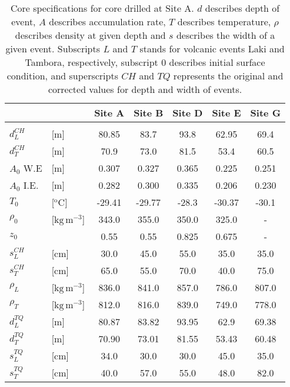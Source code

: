 \documentclass[../../CompleteThesis2/Complete_2ndDraft]{subfiles}
\begin{document}
	\begin{table}[h]
	\centering
	\begin{tabular}{l l|c c c c c}
		& & \textbf{Site A}& \textbf{Site B}& \textbf{Site D}& \textbf{Site E}& \textbf{Site G} \\[0.1cm]
		\hline 
		&&&&&& \\
		$d_{L}^{CH}$ & [m] & 80.85 & 83.7 & 93.8 & 62.95 & 69.4 \\[0.15cm]
		$d_{T}^{CH}$ & [m] & 70.9 & 73.0 & 81.5 & 53.4 & 60.5 \\[0.15cm]
		$A_0$ W.E & [m] & 0.307 & 0.327 & 0.365 & 0.225 & 0.251 \\[0.15cm]
		$A_0$ I.E. & [m] & 0.282 & 0.300 & 0.335 & 0.206 & 0.230 \\[0.15cm]
		$T_0$ & [$^{\text{o}}$C] & -29.41 & -29.77 & -28.3 & -30.37 & -30.1 \\[0.15cm]
		$\rho_0$ & [$\text{kg}\,\text{m}^{-3}$] & 343.0 & 355.0 & 350.0 & 325.0 & - \\[0.15cm]
		$z_0$ & & 0.55 & 0.55 & 0.825 & 0.675 & - \\[0.15cm]
		$s_L^{CH}$ & [cm] & 30.0 & 45.0 & 55.0 & 35.0 & 35.0 \\[0.15cm]
		$s_T^{CH}$ & [cm] & 65.0 & 55.0 & 70.0 & 40.0 & 75.0 \\[0.15cm]
		$\rho_L$ & [$\text{kg}\,\text{m}^{-3}$] & 836.0 & 841.0 & 857.0 & 786.0 & 807.0 \\[0.15cm]
		$\rho_T$ & [$\text{kg}\,\text{m}^{-3}$] & 812.0 & 816.0 & 839.0 & 749.0 & 778.0 \\[0.15cm]		
		$d_{L}^{TQ}$ & [m] & 80.87 & 83.82 & 93.95 & 62.9 & 69.38 \\[0.15cm]
		$d_{T}^{TQ}$ & [m] & 70.90 & 73.01 & 81.55 & 53.43 & 60.48\\[0.15cm]
		$s_L^{TQ}$ & [cm] & 34.0 & 30.0 & 30.0 & 45.0 & 35.0 \\[0.15cm]
		$s_T^{TQ}$ & [cm] & 40.0 & 57.0 & 55.0 & 48.0 & 82.0 \\[0.15cm]
		
	\end{tabular}
	\caption[Core specifications for core drilled at Site A.]{\small Core specifications for core drilled at Site A. $d$ describes depth of event, $A$ describes accumulation rate, $T$ describes temperature, $\rho$ describes density at given depth and $s$ describes the width of a given event. Subscripts $L$ and $T$ stands for volcanic events Laki and Tambora, respectively, subscript $0$ describes initial surface condition, and superscripts $CH$ and $TQ$ represents the original and corrected values for depth and width of events.}
	\label{tab:InterpSamples}
\end{table}
\end{document}
